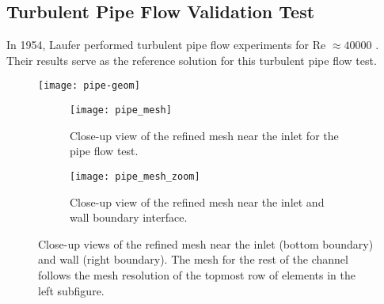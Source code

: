 \subsection{Turbulent Pipe Flow Validation Test}

In 1954, Laufer performed turbulent pipe flow experiments for Re $\approx 40000$
\cite{laufer_structure_1954}. Their results serve as the reference solution for this turbulent pipe
flow test.

\begin{figure}[p]
  \centering
  \texttt{[image: pipe-geom]}
  \caption{Pipe geometry for the turbulent pipe flow verification test. The red box indicates
  the region shown by the close-up views in Figure \ref{fig:pipe-mesh}.}
  \label{fig:pipe-geom}
  \centering
  \begin{subfigure}[b]{0.40\columnwidth}
    \centering
    \texttt{[image: pipe\_mesh]}
    \caption{Close-up view of the refined mesh near the inlet for the pipe flow test.}
    \label{fig:pipe-mesh-1}
  \end{subfigure}
  \hfill
  \begin{subfigure}[b]{0.53\columnwidth}
    \centering
    \texttt{[image: pipe\_mesh\_zoom]}
    \caption{Close-up view of the refined mesh near the inlet and wall boundary interface.}
    \label{fig:pipe-mesh-2}
  \end{subfigure}
  \caption{Close-up views of the refined mesh near the inlet (bottom boundary) and wall (right
  boundary). The mesh for the rest of the channel follows the mesh resolution of the topmost row of
  elements in the left subfigure.}
  \label{fig:pipe-mesh}
\end{figure}

